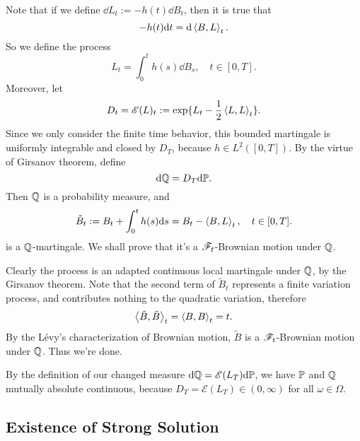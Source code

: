 \documentclass[8pt,onesided]{article}
\begin{document}
Note that if we define $\dd L_t:= -h(t)\dd B_t$, then it is true that 
\begin{equation*}
    -h(t)\dd t=\dd \left\langle B,L\right\rangle_t.
\end{equation*}
So we define the process 
\begin{equation*}
    L_t=\int_0^t h(s)\dd B_s, \quad t\in[0,T].
\end{equation*}
Moreover, let
\begin{equation*}
    D_t=\mathscr{E}(L)_t:=\exp\{L_t-\frac{1}{2}\left\langle L,L\right\rangle_t\}.
\end{equation*}
Since we only consider the finite time behavior, this bounded martingale is uniformly integrable and closed by $D_T$, because $h \in L^2([0,T])$. By the virtue of Girsanov theorem, define
\begin{equation*}
    \dd \mathbb{Q}=D_T \dd \mathbb{P}.
\end{equation*}
Then $\mathbb{Q}$ is a probability measure, and
\begin{equation*}
   \tilde{B}_t:=B_t+\int_0^t h(s)\dd s= B_t-\left\langle B,L\right\rangle_t, \quad t\in [0,T].
\end{equation*}
is a $\mathbb{Q}$-martingale. We shall prove that it's a $\mathscr{F}_t$-Brownian motion under $\mathbb{Q}$. 

Clearly the process is an adapted continuous local martingale under $\mathbb{Q}$, by the Girsanov theorem. Note that the second term of $\tilde{B}_t$ represents a finite variation process, and contributes nothing to the quadratic variation, therefore
\begin{equation*}
    \left\langle \tilde{B},\tilde{B}\right\rangle_t= \left\langle B,B\right\rangle_t=t.
\end{equation*}
By the L\'{e}vy's characterization of Brownian motion, $\tilde B$ is a $\mathscr{F}_t$-Brownian motion under $\mathbb{Q}$. Thus we're done.


\begin{remark}
    By the definition of our changed measure $\dd\mathbb{Q}=\mathscr{E}(L_T) \dd \mathbb{P}$, we have $\mathbb{P}$ and $\mathbb{Q}$ mutually absolute continuous, because $D_T=\mathscr{E}(L_T)\in (0,\infty)$ for all $\omega\in \Omega$.
\end{remark}

\subsection{Existence of Strong Solution}
\end{document}
